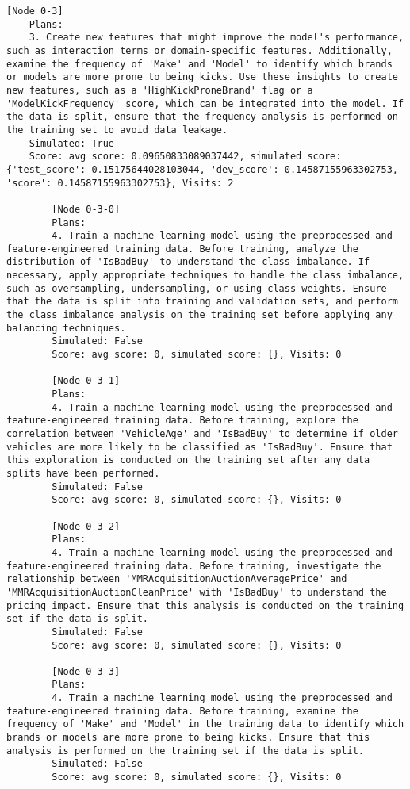 \begin{lstlisting}[style=txtfile]
	[Node 0-3]
	Plans: 
	3. Create new features that might improve the model's performance, such as interaction terms or domain-specific features. Additionally, examine the frequency of 'Make' and 'Model' to identify which brands or models are more prone to being kicks. Use these insights to create new features, such as a 'HighKickProneBrand' flag or a 'ModelKickFrequency' score, which can be integrated into the model. If the data is split, ensure that the frequency analysis is performed on the training set to avoid data leakage.
	Simulated: True
	Score: avg score: 0.09650833089037442, simulated score: {'test_score': 0.15175644028103044, 'dev_score': 0.14587155963302753, 'score': 0.14587155963302753}, Visits: 2

		[Node 0-3-0]
		Plans: 
		4. Train a machine learning model using the preprocessed and feature-engineered training data. Before training, analyze the distribution of 'IsBadBuy' to understand the class imbalance. If necessary, apply appropriate techniques to handle the class imbalance, such as oversampling, undersampling, or using class weights. Ensure that the data is split into training and validation sets, and perform the class imbalance analysis on the training set before applying any balancing techniques.
		Simulated: False
		Score: avg score: 0, simulated score: {}, Visits: 0

		[Node 0-3-1]
		Plans: 
		4. Train a machine learning model using the preprocessed and feature-engineered training data. Before training, explore the correlation between 'VehicleAge' and 'IsBadBuy' to determine if older vehicles are more likely to be classified as 'IsBadBuy'. Ensure that this exploration is conducted on the training set after any data splits have been performed.
		Simulated: False
		Score: avg score: 0, simulated score: {}, Visits: 0

		[Node 0-3-2]
		Plans: 
		4. Train a machine learning model using the preprocessed and feature-engineered training data. Before training, investigate the relationship between 'MMRAcquisitionAuctionAveragePrice' and 'MMRAcquisitionAuctionCleanPrice' with 'IsBadBuy' to understand the pricing impact. Ensure that this analysis is conducted on the training set if the data is split.
		Simulated: False
		Score: avg score: 0, simulated score: {}, Visits: 0

		[Node 0-3-3]
		Plans: 
		4. Train a machine learning model using the preprocessed and feature-engineered training data. Before training, examine the frequency of 'Make' and 'Model' in the training data to identify which brands or models are more prone to being kicks. Ensure that this analysis is performed on the training set if the data is split.
		Simulated: False
		Score: avg score: 0, simulated score: {}, Visits: 0


\end{lstlisting}

